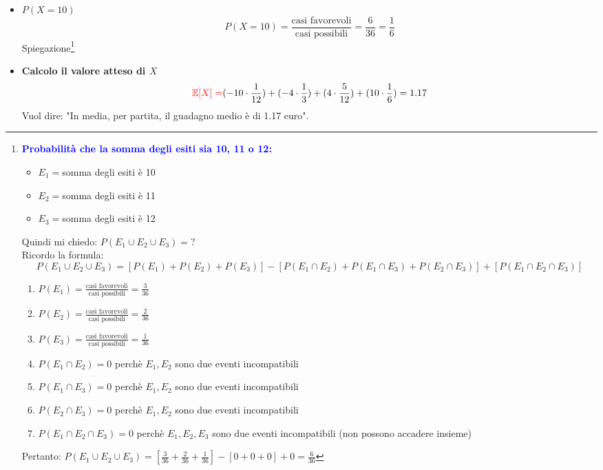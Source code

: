 \documentclass{article}  %
\theoremstyle{definition}
\begin{document}
\begin{esercizio}[Esercizio]
\begin{enumerate}
\begin{itemize}
{\begin{enumerate}
				            \end{enumerate}
				            Pertanto: $P(E_1 \cup E_2 \cup E_3)=\left[\frac{6}{36}+\frac{5}{36}+\frac{4}{36}\right]-\left[0+0+0\right]+0=\frac{15}{36}$
			            }
			      \item $P(X=10)$
			            \[
				            P(X=10)=\frac{\text{casi favorevoli}}{\text{casi possibili}}=\frac{6}{36}=\frac{1}{6}
			            \]
			            Spiegazione\footnote{\tiny
				            \textcolor{blue}{\textbf{Probabilità che la somma degli esiti sia 10, 11 o 12:}}
				            \begin{itemize}
					            \item $E_1=$somma degli esiti è 10
					            \item $E_2=$somma degli esiti è 11
					            \item $E_3=$somma degli esiti è 12
				            \end{itemize}
				            Quindi mi chiedo: $P(E_1 \cup E_2 \cup E_3)=?$ \\
				            Ricordo la formula:
				            \[
					            P(E_1 \cup E_2 \cup E_3)=\left[P(E_1)+P(E_2)+P(E_3)\right]-\left[P(E_1 \cap E_2)+P(E_1 \cap E_3)+P(E_2 \cap E_3)\right]+\left[P(E_1 \cap E_2 \cap E_3)\right]
				            \]
				            \begin{enumerate}
					            \item $P(E_1)=\frac{\text{casi favorevoli}}{\text{casi possibili}}=\frac{3}{36}$
					            \item $P(E_2)=\frac{\text{casi favorevoli}}{\text{casi possibili}}=\frac{2}{36}$
					            \item $P(E_3)=\frac{\text{casi favorevoli}}{\text{casi possibili}}=\frac{1}{36}$
					            \item $P(E_1 \cap E_2)=0$ perchè $E_1,E_2$ sono due eventi incompatibili
					            \item $P(E_1 \cap E_3)=0$ perchè $E_1,E_2$ sono due eventi incompatibili
					            \item $P(E_2 \cap E_3)=0$ perchè $E_1,E_2$ sono due eventi incompatibili
					            \item $P(E_1 \cap E_2 \cap E_3)=0$ perchè $E_1,E_2,E_3$ sono due eventi incompatibili (non possono accadere insieme)
				            \end{enumerate}
				            Pertanto: $P(E_1 \cup E_2 \cup E_3)=\left[\frac{3}{36}+\frac{2}{36}+\frac{1}{36}\right]-\left[0+0+0\right]+0=\frac{6}{36}$
			            }
			      \item \textbf{Calcolo il valore atteso di $X$}
			            \[
				            \textcolor{red}{\mathbb{E}[X]=}(-10 \cdot \frac{1}{12})+(-4 \cdot \frac{1}{3})+(4 \cdot \frac{5}{12})+(10 \cdot \frac{1}{6})=1.17
			            \]
			            Vuol dire: "In media, per partita, il guadagno medio è di 1.17 euro".
		      \end{itemize}
	\end{enumerate}
\end{esercizio}
\end{document}
